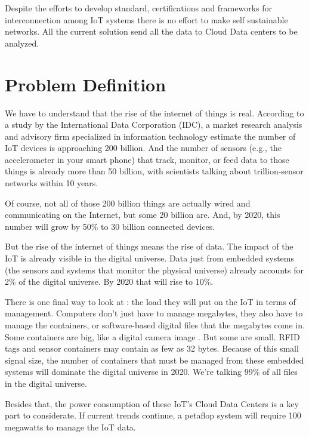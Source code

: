 Despite the efforts to develop standard, certifications and frameworks for 
interconnection among IoT systems there is no effort to make self sustainable 
networks. All the current solution send all the data to Cloud Data centers to be 
analyzed. 



\section{Problem Definition}
\noindent

We have to understand that the rise of the internet of things is real. According 
to a study by the International Data Corporation (IDC), a market research 
analysis and advisory firm specialized in information technology estimate the 
number of IoT devices is approaching  200 billion. And the number of sensors 
(e.g., the accelerometer in your smart phone) that track, monitor, or feed data 
to those things is already more than 50 billion, with scientists talking about 
trillion-sensor networks within 10 years.

Of course, not all of those 200 billion things are actually wired and 
communicating on the Internet, but some 20 billion are. And, by 2020, this 
number will grow by 50\% to 30 billion connected devices.

But the rise of the internet of things means the rise of data. The impact of the 
IoT is already visible in the digital universe. Data just from embedded systems 
(the sensors and systems that monitor the physical universe) already accounts 
for 2\% of the digital universe. By 2020 that will rise to 10\%.

There is one final way to look at : the load they will put on the IoT in terms 
of management. Computers don't just have to manage megabytes, they also have 
to manage the containers, or software-based digital files that the megabytes 
come in. Some containers are big, like a digital camera image . But some are 
small. RFID tags and sensor containers may contain as few as 32 bytes. Because 
of this small signal size, the number of containers that must be managed from 
these embedded systems will dominate the digital universe in 2020. We’re 
talking 99\% of all files in the digital universe.

Besides that, the power consumption of these  IoT’s Cloud Data Centers is a key
part to considerate. If current trends continue, a petaflop system will require 
100 megawatts to manage the IoT data. 

